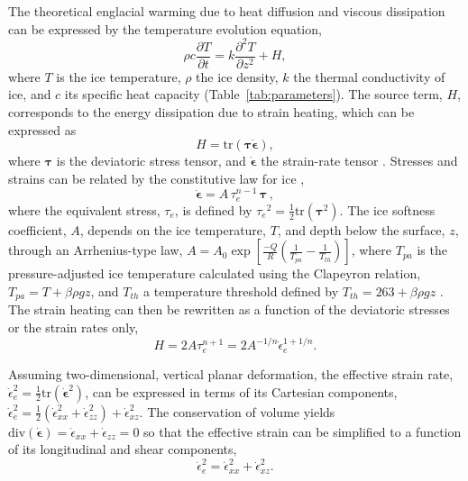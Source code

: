 \documentclass[utf8]{article}
\begin{document}
    The theoretical englacial warming due to heat diffusion and viscous
    dissipation can be expressed by the temperature evolution equation,
    \begin{equation}
      \rho c \frac{\partial T}{\partial t}
        = k \frac{\partial^2 T}{\partial z^2} + H,
    \end{equation}
    where $T$ is the ice temperature, $\rho$ the ice density, $k$ the
    thermal conductivity of ice, and $c$ its specific heat capacity
    (Table~\ref{tab:parameters}). The source term, $H$, corresponds to the
    energy dissipation due to strain heating, which can be expressed as
    \begin{equation}
      H = \mathrm{tr}(\bm{\tau\dot\epsilon}),
    \end{equation}
    where $\bm\tau$ is the deviatoric stress tensor, and $\bm{\dot\epsilon}$ the
    strain-rate tensor \citep[p.~417]{Clarke.etal.1977, Cuffey.Paterson.2010}.
    Stresses and strains can be related by the constitutive law for ice
    \citep{Glen.1952, Nye.1953},
    \begin{equation}
        \bm{\dot\epsilon} = A\,\tau_e^{n-1}\,\bm{\tau} \,,
    \end{equation}
    where the equivalent stress, $\tau_e$, is defined by ${\tau_e}^2 =
    \frac{1}{2} \mathrm{tr}(\bm\tau^2)$. The ice softness coefficient, $A$,
    depends on the ice temperature, $T$, and depth below the surface, $z$,
    through an Arrhenius-type law,
    ${A = A_0 \exp[\frac{-Q}{R}(\frac{1}{T_{pa}}-\frac{1}{T_{th}})]}$, where
    $T_{pa}$ is the pressure-adjusted ice temperature calculated using the
    Clapeyron relation, ${T_{pa} = T + \beta \rho g z}$, and $T_{th}$ a
    temperature threshold defined by ${T_{th} = 263 + \beta \rho g z}$
    \citep[p.~72]{Cuffey.Paterson.2010}.
    The strain heating can then be rewritten as a function of the deviatoric
    stresses or the strain rates only,
    \begin{equation}
        H = 2 A \tau_e^{n+1} = 2 A^{-1/n} \dot\epsilon_e^{1+1/n}.
    \end{equation}

    Assuming two-dimensional, vertical planar deformation, the effective strain
    rate, ${\dot\epsilon_e^2 = \frac{1}{2}\mathrm{tr}(\bm{\dot\epsilon}^2)}$,
    can be expressed in terms of its Cartesian components, ${\dot\epsilon_e^2 =
    \frac{1}{2}(\dot\epsilon_{xx}^2 + \dot\epsilon_{zz}^2) +
    \dot\epsilon_{xz}^2}$. The conservation of volume yields
    ${\mathrm{div}(\bm{\dot\epsilon}) = \dot\epsilon_{xx} + \dot\epsilon_{zz} =
    0}$ so that the effective strain can be simplified to a function of its
    longitudinal and shear components,
    \begin{equation}
        \dot\epsilon_e^2 = \dot\epsilon_{xx}^2 + \dot\epsilon_{xz}^2.
    \end{equation}
\end{document}

